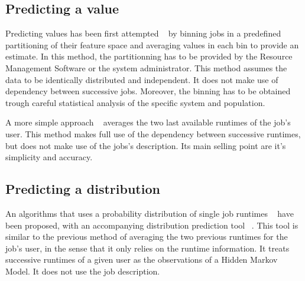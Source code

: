 \documentclass{article}
\begin{document}
\subsection{Predicting a value}
\label{sub:predicting_a_value}

Predicting values has been first attempted ~\cite{gibbons} by binning jobs in a predefined partitioning of their feature space and averaging values in each bin to provide an estimate. In this method, the partitionning has to be provided by the Resource Management Software or the system administrator. This method assumes the data to be identically distributed and independent. It does not make use of dependency between successive jobs. Moreover, the binning has to be obtained trough careful statistical analysis of the specific system and population.

A more simple approach ~\cite{tsafir} averages the two last available runtimes of the job's user.
This method makes full use of the dependency between successive runtimes, but does not make use of the jobs's description. Its main selling point are it's simplicity and accuracy.


\subsection{Predicting a distribution}
\label{sub:predicting_a_distribution}

An algorithms that uses a probability distribution of single job runtimes ~\cite{probabilistic-backfilling} have been proposed, with an accompanying distribution prediction tool ~\cite{hmm}. This tool is similar to the previous method of averaging the two previous runtimes for the job's user, in the sense that it only relies on the runtime information. It treats successive runtimes of a given user as the observations of a Hidden Markov Model. It does not use the job description.

\end{document}
